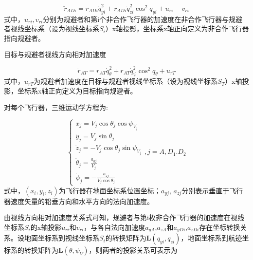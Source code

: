 \begin{equation}
\label{eq:3}
{\ddot r_{ADi}} = {r_{ADi}}\dot q_{yi}^2 + {r_{ADi}}\dot q_{zi}^2{\cos ^2}{q_{yi}} + {u_{ri}} - {v_{ri}}
\end{equation}
式中，${u_{ri}},{v_{ri}}$分别为规避者和第i个非合作飞行器的加速度在非合作飞行器与规避者视线坐标系（设为视线坐标系${S_i}$）x轴投影，坐标系x轴正向定义为非合作飞行器指向规避者。

目标与规避者视线方向相对加速度

\begin{equation}
\label{eq:4}
{\ddot r_{AT}} = {r_{AT}}\dot q_\theta ^2 + {r_{AT}}\dot q_\psi ^2{\cos ^2}{q_\theta } + {u_{rT}}
\end{equation}
式中，${u_{rT}}$为规避者加速度在目标与规避者视线坐标系（设为视线坐标系${S_T}$）x轴投影，坐标系x轴正向定义为目标指向规避者。

对每个飞行器，三维运动学方程为:

\begin{equation}
\label{eq:5}
\left\{ {\begin{array}{*{20}{l}}
  {{{\dot x}_j} = {V_j}\cos {\theta _j}\cos {\psi _{{V_j}}}} \\ 
  {{{\dot y}_j} = {V_j}\sin {\theta _j}} \\ 
  {{{\dot z}_j} =  - {V_j}\cos {\theta _j}\sin {\psi _{{V_j}}}} \\ 
  {{{\dot \theta }_j} = \frac{{{a_{yj}}}}{{{V_j}}}} \\ 
  {{{\dot \psi }_j} =  - \frac{{{a_{zj}}}}{{{V_j}\cos {\theta _j}}}} 
\end{array},j = A,{D_1}.{D_2}} \right.
\end{equation}
式中，$({x_i},{y_i},{z_i})$为飞行器在地面坐标系位置坐标；${a_{yj}}$, ${a_{zj}}$分别表示垂直于飞行器速度矢量的铅垂方向和水平方向的法向加速度。

由视线方向相对加速度关系式可知，规避者与第i枚非合作飞行器的加速度在视线坐标系${S_i}$的x轴投影${u_{ri}}$和${v_{ri}}$，与各自法向加速度${a_{yA}}$,${a_{zA}}$和${a_{yDi}}$,${a_{zDi}}$存在坐标转换关系。设地面坐标系到视线坐标系${S_i}$的转换矩阵为${\mathbf{L}}({q_{yi}},{q_{zi}})$，地面坐标系到航迹坐标系的转换矩阵为${\mathbf{L}}(\theta ,{\psi _V})$，则两者的投影关系可表示为

